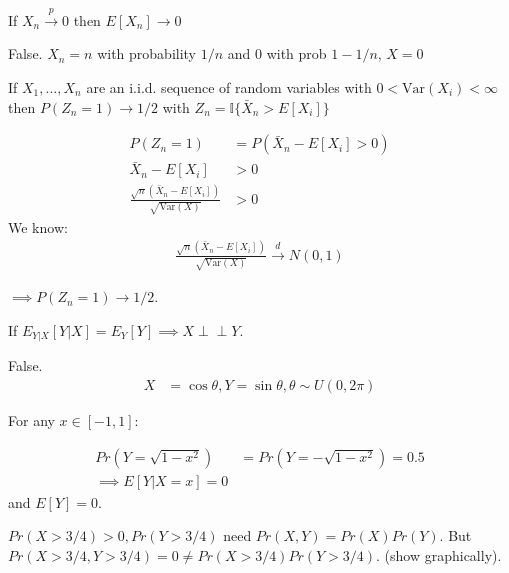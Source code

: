 \documentclass{exam}
\newcommand{\indep}{\perp \!\!\! \perp}
\begin{document}
    


\begin{questions}
    
\question If $X_n \xrightarrow{p} 0$ then $E[X_n] \rightarrow 0$
\begin{solution}
False. $X_n = n$ with probability $1/n$ and 0 with prob $1 - 1/n$,  $X = 0$
\end{solution}



\question If $X_1,...,X_n$ are an i.i.d. sequence of random variables with $0 < \text{Var}(X_i) < \infty$ then 
$P(Z_n = 1) \rightarrow 1/2$ with $Z_n = \mathbb{I}\{\bar{X}_n > E[X_i]\}$


\begin{solution}
    \begin{align*}
    P(Z_n = 1) &= P(\bar{X}_n - E[X_i] > 0) \\
    \bar{X}_n - E[X_i] &> 0 \\
    \frac{
        \sqrt{n}(\bar{X}_n - E[X_i])
    }{
        \sqrt{\text{Var}(X)}
    } &> 0 
    \end{align*}
    We know:
    \begin{align*}
    \frac{
        \sqrt{n}(\bar{X}_n - E[X_i])
    }{
        \sqrt{\text{Var}(X)}
    } \xrightarrow{d} N(0, 1)
    \end{align*}

    $\implies P(Z_n = 1) \rightarrow 1/2$.

\end{solution}




    \question If $E_{Y | X}[Y | X ] = E_Y[Y] \implies X \indep Y$.

    \begin{solution}
        
    False. 
    \begin{align*}
        X &= \cos \theta, Y = \sin \theta, \theta \sim U(0, 2\pi)
    \end{align*}

    For any $x \in [-1, 1]$:

    \begin{align*}
        Pr(Y = \sqrt{1 - x^2}) &= Pr(Y = - \sqrt{1 - x^2}) = 0.5 \\
        \implies E[Y | X = x] = 0
    \end{align*}
    and $E[Y] = 0$.

    $Pr(X > 3/4) > 0, Pr(Y > 3/4)$ need $Pr(X, Y) = Pr(X)Pr(Y)$.
    But $Pr(X > 3/4, Y > 3/4) = 0 \neq Pr(X > 3/4)Pr(Y > 3/4)$. (show graphically).



\end{solution}
\end{questions}
\end{document}
